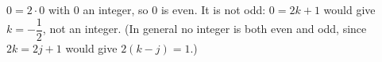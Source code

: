 $0=2\cdot0$ with $0$ an integer, so $0$ is $\boxed{\text{even}}$. It is not odd: $0=2k+1$ would give $k=-\dfrac12$, not an integer. (In general no integer is both even and odd, since $2k=2j+1$ would give $2(k-j)=1$.)
